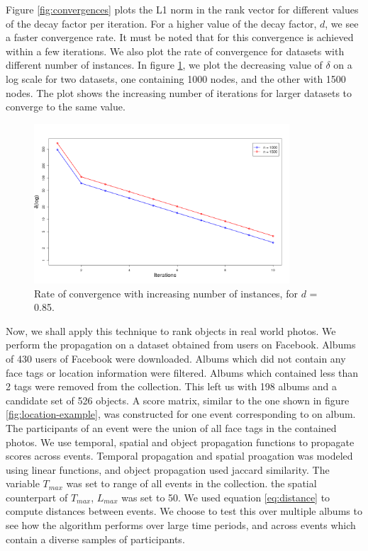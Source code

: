Figure \ref{fig:convergences} plots the L1 norm in the rank vector for different values of the decay factor per iteration. For a higher value of the decay factor, $d$, we see a faster convergence rate. It must be noted that for this convergence is achieved within a few iterations. We also plot the rate of convergence for datasets with different number of instances. In figure \ref{fig:convergences-inreasing-nodes}, we plot the decreasing value of $\delta$ on a log scale for two datasets, one containing 1000 nodes, and the other with 1500 nodes. The plot shows the increasing number of iterations for larger datasets to converge to the same value.

\begin{figure}[h]
\centering
\includegraphics[width=0.85\textwidth]{media/chapter6/convergence-with-node-change.png}
\caption{Rate of convergence with increasing number of instances, for $d$ = 0.85.}
\label{fig:convergences-inreasing-nodes}
\end{figure}

Now, we shall apply this technique to rank objects in real world photos. We perform the propagation on a dataset obtained from users on Facebook. Albums of 430 users of Facebook were downloaded. Albums which did not contain any face tags or location information were filtered. Albums which contained less than 2 tags were removed from the collection. This left us with 198 albums and a candidate set of 526 objects. A score matrix, similar to the one shown in figure \ref{fig:location-example}, was constructed for one event corresponding to on album. The participants of an event were the union of all face tags in the contained photos. We use temporal, spatial and object propagation functions to propagate scores across events. Temporal propagation and spatial proagation was modeled using linear functions, and object propagation used jaccard similarity. The variable $T_{max}$ was set to range of all events in the collection. the spatial counterpart of $T_{max}$, $L_{max}$ was set to 50. We used equation \ref{eq:distance} to compute distances between events. We choose to test this over multiple albums to see how the algorithm performs over large time periods, and across events which contain a diverse samples of participants.

